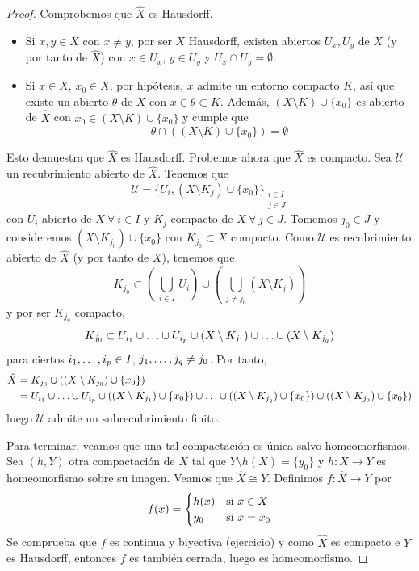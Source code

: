 \documentclass[12pt]{report}
\theoremstyle{definition}
\theoremstyle{definition}
\theoremstyle{remark}
\begin{document}
\begin{proof}
\vspace{2mm}
Comprobemos que $\hat{X}$ es Hausdorff. 
\begin{itemize}
    \item Si $x,y \in X$ con $x \neq y$, por ser $X$ Hausdorff, existen abiertos $U_x,U_y$ de $X$ (y por tanto de $\hat{X}$) con $x \in U_x$, $y \in U_y$ y $U_x \cap U_y = \emptyset$.
    \item Si $x \in X$, $x_0 \in \hat{X}$, por hipótesis, $x$ admite un entorno compacto $K$, así que existe un abierto $\theta$ de $X$ con $x \in \theta \subset K$. Además, $(X \setminus K) \cup \{x_0\}$ es abierto de $\hat{X}$ con $x_0 \in (X \setminus K) \cup \{x_0\}$ y cumple que
    \[\theta \cap ((X \setminus K) \cup \{x_0\}) = \emptyset\]
\end{itemize}
Esto demuestra que $\hat{X}$ es Hausdorff. Probemos ahora que $\hat{X}$ es compacto. Sea $\mathcal{U}$ un recubrimiento abierto de $\hat{X}$. Tenemos que
\[\mathcal{U} = \{U_i, (X \setminus K_j) \cup \{x_0\}\}_{\substack{i \in I \\ j \in J}}\]
con $U_i$ abierto de $X \ \forall \ i \in I$ y $K_j$ compacto de $X \ \forall \ j \in J$. Tomemos $j_0 \in J$ y consideremos $(X \setminus K_{j_0}) \cup \{x_0\}$ con $K_{j_0} \subset X$ compacto. Como $\mathcal{U}$ es recubrimiento abierto de $\hat{X}$ (y por tanto de $X$), tenemos que
\[K_{j_0} \subset \left( \, \bigcup_{i \in I} \, U_i \right) \cup \left( \, \bigcup_{j \neq j_0}(X \setminus K_j) \right)\]
y por ser $K_{j_0}$ compacto, 
\[K_{j_0} \subset U_{i_1} \cup \mathellipsis \cup U_{i_p} \cup (X \setminus K_{j_1}) \cup \mathellipsis \cup (X \setminus K_{j_q})\]
para ciertos $i_1,\mathellipsis,i_p \in I$, $j_1,\mathellipsis,j_q \neq j_0$. Por tanto,
\[
\begin{aligned}[t]
    \hat{X} &= K_{j_0} \cup ((X \setminus K_{j_0}) \cup \{x_0\}) \\
    &= U_{i_1} \cup \mathellipsis \cup U_{i_p} \cup ((X \setminus K_{j_1}) \cup \{x_0\}) \cup \mathellipsis \cup ((X \setminus K_{j_q}) \cup \{x_0\}) \cup ((X \setminus K_{j_0}) \cup \{x_0\})
\end{aligned}
\]
luego $\mathcal{U}$ admite un subrecubrimiento finito.

\vspace{2mm}
Para terminar, veamos que una tal compactación es única salvo homeomorfismos. Sea $(h,Y)$ otra compactación de $X$ tal que $Y \setminus h(X) = \{y_0\}$ y $h \colon X \to Y$ es homeomorfismo sobre su imagen. Veamos que $\hat{X} \cong Y$. Definimos $f \colon \hat{X} \to Y$ por
\[
f(x) = 
\begin{cases}
h(x) & $si$ \ x \in X \\
y_0 & $si$ \ x = x_0
\end{cases}
\]
Se comprueba que $f$ es continua y biyectiva (ejercicio) y como $\hat{X}$ es compacto e $Y$ es Hausdorff, entonces $f$ es también cerrada, luego es homeomorfismo.
\end{proof}
\end{document}
